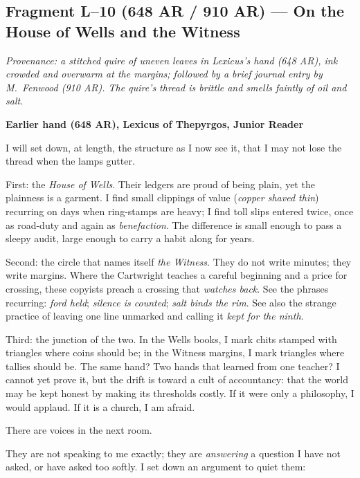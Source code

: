 \documentclass[11pt]{article}
\begin{document}
\subsection{Fragment L--10 (648 AR / 910 AR) --- On the House of Wells and the Witness}
\label{frag:l10}
{}

\noindent\textit{Provenance: a stitched quire of uneven leaves in Lexicus’s hand (648 AR), ink crowded and overwarm at the margins; followed by a brief journal entry by M.\ Fenwood (910 AR). The quire’s thread is brittle and smells faintly of oil and salt.}

\medskip
\noindent\textbf{Earlier hand (648 AR), Lexicus of Thepyrgos, Junior Reader}

I will set down, at length, the structure as I now see it, that I may not lose the thread when the lamps gutter.

First: the \textit{House of Wells}. Their ledgers are proud of being plain, yet the plainness is a garment. I find small clippings of value (\emph{copper shaved thin}) recurring on days when ring-stamps are heavy; I find toll slips entered twice, once as road-duty and again as \emph{benefaction}. The difference is small enough to pass a sleepy audit, large enough to carry a habit along for years.

Second: the circle that names itself \textit{the Witness}. They do not write minutes; they write margins. Where the Cartwright teaches a careful beginning and a price for crossing, these copyists preach a crossing that \emph{watches back}. See the phrases recurring: \emph{ford held}; \emph{silence is counted}; \emph{salt binds the rim}. See also the strange practice of leaving one line unmarked and calling it \emph{kept for the ninth}.

Third: the junction of the two. In the Wells books, I mark chits stamped with triangles where coins should be; in the Witness margins, I mark triangles where tallies should be. The same hand? Two hands that learned from one teacher? I cannot yet prove it, but the drift is toward a cult of accountancy: that the world may be kept honest by making its thresholds costly. If it were only a philosophy, I would applaud. If it is a church, I am afraid.

There are voices in the next room.

They are not speaking to me exactly; they are \emph{answering} a question I have not asked, or have asked too softly. I set down an argument to quiet them:
\end{document}
